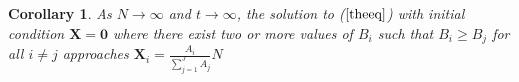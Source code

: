 \documentclass{article}
\newtheorem{cor}{Corollary}
\begin{document}
\begin{cor}
  As $N \rightarrow \infty$ and $t \rightarrow \infty$, the solution to ($\ref{theeq}$) with initial condition $\mathbf{X} = \mathbf{0}$ where there exist two or more values of $B_i$ such that $B_i \ge B_j$ for all $i\ne j$ approaches $\mathbf{X}_i = \frac{A_i}{\sum_{j=1}^J A_j}N$

\end{cor}
\end{document}
